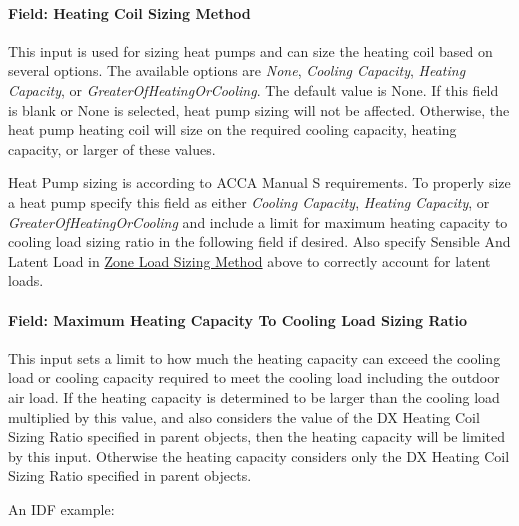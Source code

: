 \paragraph{Field: Heating Coil Sizing Method}\label{field-heating-coil-sizing-method-0101}

This input is used for sizing heat pumps and can size the heating coil based on several options. The available options are \emph{None}, \emph{Cooling Capacity}, \emph{Heating Capacity}, or \emph{GreaterOfHeatingOrCooling}. The default value is None. If this field is blank or None is selected, heat pump sizing will not be affected. Otherwise, the heat pump heating coil will size on the required cooling capacity, heating capacity, or larger of these values.

Heat Pump sizing is according to ACCA Manual S requirements. To properly size a heat pump specify this field as either \emph{Cooling Capacity}, \emph{Heating Capacity}, or \emph{GreaterOfHeatingOrCooling} and include a limit for maximum heating capacity to cooling load sizing ratio in the following field if desired. Also specify Sensible And Latent Load in \hyperref[field-zone-load-sizing-method]{Zone Load Sizing Method} above to correctly account for latent loads.

\paragraph{Field: Maximum Heating Capacity To Cooling Load Sizing Ratio}\label{maximum-heating-capacity-to-cooling-load-sizing-ratio-0101}

This input sets a limit to how much the heating capacity can exceed the cooling load or cooling capacity required to meet the cooling load including the outdoor air load. If the heating capacity is determined to be larger than the cooling load multiplied by this value, and also considers the value of the DX Heating Coil Sizing Ratio specified in parent objects, then the heating capacity will be limited by this input. Otherwise the heating capacity considers only the DX Heating Coil Sizing Ratio specified in parent objects.

An IDF example:

